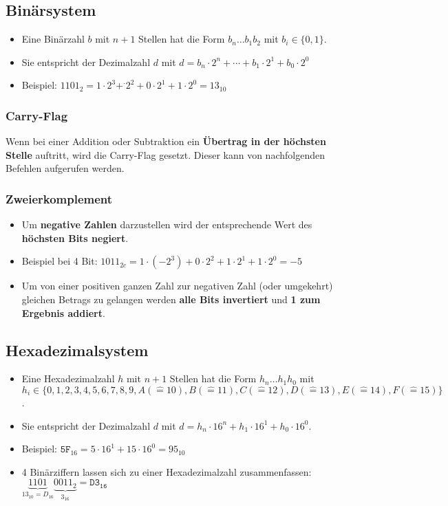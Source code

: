 \documentclass[12pt]{article}
\begin{document}
\subsection{Binärsystem}
\begin{itemize}[leftmargin=*]
    \item[] Eine Binärzahl $b$ mit $n + 1$ Stellen hat die Form $b_n\dots b_1 b_2$ mit $b_i \in \{0,1\}$.
    \item[] Sie entspricht der Dezimalzahl $d$ mit $d = b_n \cdot 2^n + \cdots + b_1 \cdot 2^1 + b_0 \cdot 2^0$ 
    \item[] Beispiel: $1101_2 = 1 \cdot 2^3 + ^\cdot 2^2 + 0 \cdot 2^1 + 1 \cdot 2^0 = 13_{10}$
\end{itemize}
\subsubsection{Carry-Flag}
Wenn bei einer Addition oder Subtraktion ein \textbf{Übertrag in der höchsten Stelle} auftritt, wird die Carry-Flag gesetzt.
Dieser kann von nachfolgenden Befehlen aufgerufen werden.
\subsubsection{Zweierkomplement}
\begin{itemize}[leftmargin=*]
    \item[] Um \textbf{negative Zahlen} darzustellen wird der entsprechende Wert des \textbf{höchsten Bits negiert}.
    \item[] Beispiel bei 4 Bit: $1011_{2c} = 1 \cdot (-2^3) + 0 \cdot 2^2 + 1 \cdot 2^1 + 1 \cdot 2^0 = -5$
    \item[] Um von einer positiven ganzen Zahl zur negativen Zahl (oder umgekehrt) gleichen Betrags zu gelangen werden \textbf{alle Bits invertiert} und \textbf{1 zum Ergebnis addiert}.
\end{itemize}

\subsection{Hexadezimalsystem}
\begin{itemize}[leftmargin=*]
    \item[] Eine Hexadezimalzahl $h$ mit $n + 1$ Stellen hat die Form $h_n \dots h_1 h_0$ mit $h_i \in \{0, 1, 2, 3, 4, 5, 6, 7, 8, 9, A(\widehat{=}10), B(\widehat{=}11), C(\widehat{=}12), D(\widehat{=}13), E(\widehat{=}14), F(\widehat{=}15)\}$.
    \item[] Sie entspricht der Dezimalzahl $d$ mit $d = h_n \cdot 16^n + h_1 \cdot 16^1 + h_0 \cdot 16^0$.
    \item[] Beispiel: $\mathtt{5F}_{16} = 5 \cdot 16^1 + 15 \cdot 16^0 = 95_{10}$
    \item[] 4 Binärziffern lassen sich zu einer Hexadezimalzahl zusammenfassen:\\$\underbrace{1101}_{13_{10}=D_{16}} \underbrace{0011_2}_{3_{16}} = \mathtt{D3_{16}}$
\end{itemize}
\end{document}
